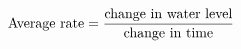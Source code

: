 \documentclass[preview]{standalone}
\begin{document}
\begin{align*}
\special{dvisvgm:raw <g id='unique000'>}\text{Average rate}= \special{dvisvgm:raw </g>}\special{dvisvgm:raw <g id='unique001'>}\frac{\text{change in water level}}{\text{change in time}}\special{dvisvgm:raw </g>}
\end{align*}
\end{document}
